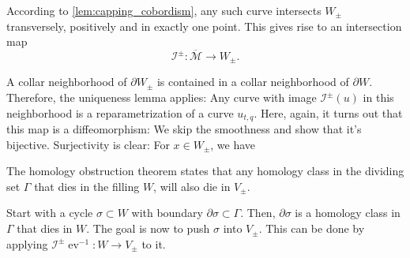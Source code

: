 According to \cref*{lem:capping_cobordism}, any such curve intersects $W_\pm$ transversely, positively and in exactly one point.
This gives rise to an intersection map
\[
    \mathcal{I}^\pm\colon \overline{\mathcal{M}} \to W_\pm.
\]

A collar neighborhood of $\partial W_\pm$ is contained in a collar neighborhood of $\partial W$.
Therefore, the uniqueness lemma applies: 
Any curve with image $\mathcal{I}^\pm(u)$ in this neighborhood is a reparametrization of a curve $u_{t,q}$.
Here, again, it turns out that this map is a diffeomorphism: We skip the smoothness and show that it's bijective.
Surjectivity is clear: For $x \in W_\pm$, we have 



The homology obstruction theorem states that any homology class in the dividing set $\Gamma$ that dies in the filling $W$,
will also die in $V_\pm$.

Start with a cycle $\sigma \subset W$ with boundary $\partial \sigma \subset \Gamma$.
Then, $\partial \sigma$ is a homology class in $\Gamma$ that dies in $W$.
The goal is now to push $\sigma$ into $V_\pm$.
This can be done by applying $\mathcal{I}^\pm\operatorname{ev}^{-1}\colon W \to V_\pm$ to it.